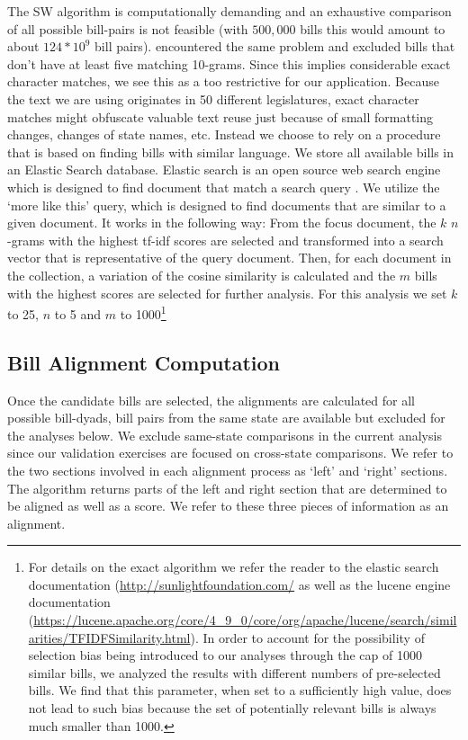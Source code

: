 \documentclass[12pt]{article} %
\begin{document}
The SW algorithm is computationally demanding and an exhaustive comparison of
all possible bill-pairs is not feasible (with $500,000$ bills this would amount
to about $124 * 10^9$ bill pairs). \citet{wilkerson2015tracing} encountered the same problem and excluded bills that don't have at least five matching 10-grams. Since this implies considerable exact character matches, we see this as a too restrictive for our application. Because the text we are using originates in 50 different legislatures, exact character matches might obfuscate valuable text reuse just because of small formatting changes, changes of state names, etc. 
Instead we choose to rely on a procedure that is based on finding bills with
similar language. We store all available bills in an Elastic Search database.
Elastic search is an open source web search engine which is designed to find
document that match a search query \citep{gormley2015elasticsearch}. We utilize
the `more like this' query, which is designed to find documents that are similar
to a given document. It works in the following way: From the focus document, the
$k$ $n$-grams with the highest tf-idf scores are selected and transformed into a
search vector that is representative of the query document. Then, for each
document in the collection, a variation of the cosine similarity is calculated
and the $m$ bills with the highest scores are selected for further analysis. For
this analysis we set $k$ to 25, $n$ to 5 and $m$ to 1000\footnote{For
details on the exact algorithm we refer the reader to the elastic search
documentation (\url{http://sunlightfoundation.com/} as well as the lucene engine
documentation
(\url{https://lucene.apache.org/core/4_9_0/core/org/apache/lucene/search/similarities/TFIDFSimilarity.html}).
In order to account for the possibility of selection bias being introduced to
our analyses through the cap of 1000 similar bills, we analyzed the results with
different numbers of pre-selected bills. We find that this parameter, when set
to a sufficiently high value, does not lead to such bias because the set of
potentially relevant bills is always much smaller than 1000.}


\subsection{Bill Alignment Computation}

Once the candidate bills are selected, the alignments are calculated for all
possible bill-dyads, bill pairs from the same state are available but excluded
for the analyses below. We exclude same-state comparisons in the current analysis since our validation exercises are focused on cross-state comparisons. We refer to the two sections involved in each alignment process as `left' and `right' sections. The algorithm returns parts of the left and right section that are determined to be aligned as well as a score. We refer to these three pieces of information as an alignment. 
\end{document}
